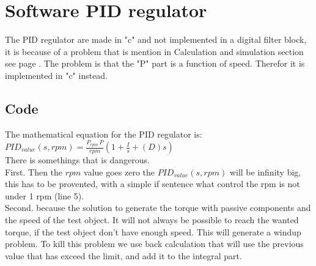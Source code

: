 \newpage
\section{Software PID regulator}

The PID regulator are made in "c" and not implemented in a digital filter block, it is because of a problem that is mention in Calculation and simulation section see page \pageref{sec:Calculation_and_Simulation}. The problem is that the "P" part is a function of speed. Therefor it is implemented in "c" instead.\\

\subsection{Code}

The mathematical equation for the PID regulator is:\\   

$ PID_{value} \left( s,rpm \right) = {\frac {P_{rpm}\,P}{rpm} \left( 1+{\frac {I}{s}}+ \left( D \right) s \right) } $\\

There is somethings that is dangerous. \\
First. Then the $ rpm $ value goes zero the $  PID_{value} \left( s,rpm \right) $ will be infinity big, this has to be provented, with a simple if sentence what control the rpm is not under 1 rpm (line 5). \\
Second. because the solution to generate the torque with passive components and the speed of the test object. It will not always be possible to reach the wanted torque, if the test object don't have enough speed. This will generate a windup problem. To kill this problem we use back calculation that will use the previous value that has exceed the limit, and add it to the integral part. 


